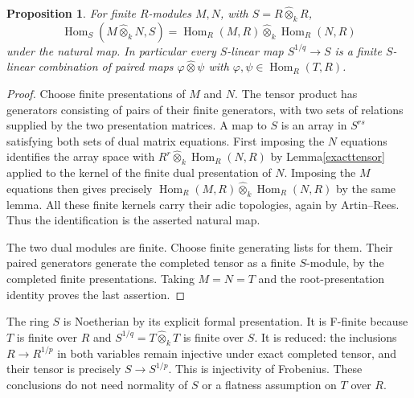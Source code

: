 \documentclass[11pt]{article}
\newtheorem{proposition}[theorem]{Proposition}
\newcommand{\Hom}{\operatorname{Hom}}
\newcommand{\wtensor}{\mathbin{\widehat\otimes}}
\begin{document}
\begin{proposition}\label{homfactor}
For finite $R$-modules $M,N$, with $S=R\wtensor_k R$,
\[
 \Hom_S(M\wtensor_k N,S)
 =\Hom_R(M,R)\wtensor_k\Hom_R(N,R)
\]
under the natural map. In particular every $S$-linear map
$S^{1/q}\to S$ is a finite $S$-linear combination of paired maps
$\varphi\wtensor\psi$ with $\varphi,\psi\in\Hom_R(T,R)$.
\end{proposition}
\begin{proof}
Choose finite presentations of $M$ and $N$.
The tensor product has generators consisting of pairs of their finite
generators, with two sets of relations supplied by the two presentation
matrices. A map to $S$ is an array in $S^{rs}$ satisfying both sets of
dual matrix equations. First imposing the $N$ equations identifies the
array space with
$R^r\wtensor_k\Hom_R(N,R)$ by Lemma\ref{exacttensor} applied to the
kernel of the finite dual presentation of $N$. Imposing the $M$ equations
then gives precisely
$\Hom_R(M,R)\wtensor_k\Hom_R(N,R)$ by the same lemma.
All these finite kernels carry their adic topologies, again by
Artin--Rees. Thus the identification is the asserted natural map.

The two dual modules are finite. Choose finite generating lists for them.
Their paired generators generate the completed tensor as a finite
$S$-module, by the completed finite presentations. Taking $M=N=T$
and the root-presentation identity proves the last assertion.
\end{proof}

The ring $S$ is Noetherian by its explicit formal presentation.
It is F-finite because $T$ is finite over $R$ and
$S^{1/q}=T\wtensor_k T$ is finite over $S$.
It is reduced: the inclusions $R\to R^{1/p}$ in both variables remain
injective under exact completed tensor, and their tensor is precisely
$S\to S^{1/p}$. This is injectivity of Frobenius. These conclusions do
not need normality of $S$ or a flatness assumption on $T$ over $R$.
\end{document}
